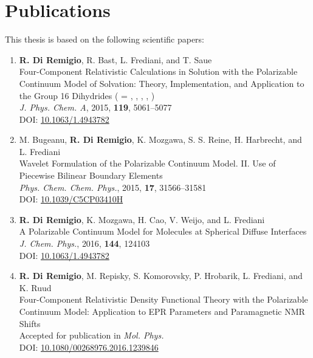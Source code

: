 \thispagestyle{empty}
{}

\chapter*{Publications}

This thesis is based on the following scientific papers:

\begin{enumerate}[label=\paper{\Roman{*}}, ref=\Roman{*}]
\item
  \textbf{R. Di Remigio}, R. Bast, L. Frediani, and T. Saue
  \\
  \textsf{
  Four-Component Relativistic Calculations in Solution with the
  Polarizable Continuum Model of Solvation: Theory,
  Implementation, and Application to the Group 16 Dihydrides
   ( = , , , ,
  )
  }
  \\
\textit{J. Phys. Chem. A}, \textrm{2015}, \textbf{119}, 5061--5077
  \\
  DOI: \url{10.1063/1.4943782}
\label{relapcm}

\item
  M. Bugeanu, \textbf{R. Di Remigio}, K. Mozgawa, S. S. Reine, H.
  Harbrecht,  and L. Frediani
  \\
  \textsf{
  Wavelet Formulation of the Polarizable Continuum Model. II. Use of
  Piecewise Bilinear Boundary Elements
  }
  \\
  \textit{Phys. Chem. Chem. Phys.}, \textrm{2015}, \textbf{17},
  31566--31581
  \\
  DOI: \url{10.1039/C5CP03410H}
\label{wemlin}

\item
  \textbf{R. Di Remigio}, K. Mozgawa, H. Cao, V. Weijo, and L.
  Frediani
  \\
  \textsf{
  A Polarizable Continuum Model for Molecules at Spherical
  Diffuse Interfaces
  }
  \\
  \textit{J. Chem. Phys.}, \textrm{2016}, \textbf{144}, 124103
  \\
  DOI: \url{10.1063/1.4943782}
\label{spherical}

\item
  \textbf{R. Di Remigio}, M. Repisky, S. Komorovsky, P. Hrobarik, L.
  Frediani, and K. Ruud
  \\
  \textsf{
  Four-Component Relativistic Density Functional Theory with the
  Polarizable Continuum Model: Application to EPR Parameters
  and Paramagnetic NMR Shifts
  }
  \\
  Accepted for publication in \textit{Mol. Phys.}
  \\
  DOI: \url{10.1080/00268976.2016.1239846}
\label{pcmepr}


\end{enumerate}
